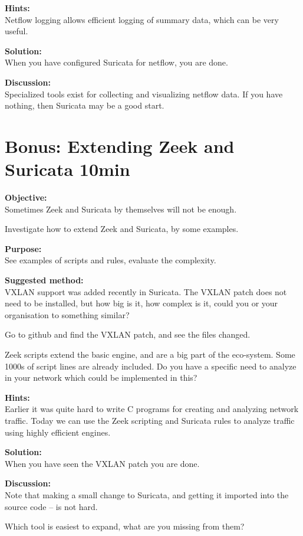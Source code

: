 \documentclass[a4paper,11pt,notitlepage]{report}
\begin{document}
{\bf Hints:}\\
Netflow logging allows efficient logging of summary data, which can be very useful.


{\bf Solution:}\\
When you have configured Suricata for netflow, you are done.


{\bf Discussion:}\\
Specialized tools exist for collecting and visualizing netflow data. If you have nothing, then Suricata may be a good start.


\chapter{Bonus: Extending Zeek and Suricata 10min}
\label{ex:extended-zeek}


{\bf Objective:} \\
Sometimes Zeek and Suricata by themselves will not be enough.

Investigate how to extend Zeek and Suricata, by some examples.

{\bf Purpose:}\\
See examples of scripts and rules, evaluate the complexity.


{\bf Suggested method:}\\
VXLAN support was added recently in Suricata. The VXLAN patch does not need to be installed, but how big is it, how complex is it, could you or your organisation to something similar?

Go to github and find the VXLAN patch, and see the files changed.

Zeek scripts extend the basic engine, and are a big part of the eco-system. Some 1000s of script lines are already included. Do you have a specific need to analyze in your network which could be implemented in this?

{\bf Hints:}\\
Earlier it was quite hard to write C programs for creating and analyzing network traffic. Today we can use the Zeek scripting and Suricata rules to analyze traffic using highly efficient engines.


{\bf Solution:}\\
When you have seen the VXLAN patch you are done.

{\bf Discussion:}\\
Note that making a small change to Suricata, and getting it imported into the source code -- is not hard.

Which tool is easiest to expand, what are you missing from them?
\end{document}
